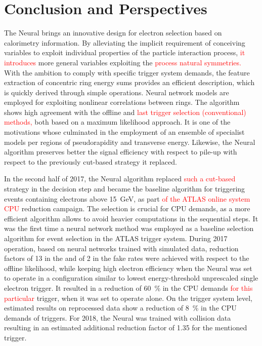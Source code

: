 \chapter{Conclusion and Perspectives}\label{sec:conclusion}






The Neural\rnn{} brings an innovative design for electron selection based on
calorimetry information. By alleviating the implicit requirement of conceiving
variables to exploit individual properties of the particle interaction process, \textcolor{red}{it introduces} 
more general variables exploiting the \textcolor{red}{process natural symmetries.} With the
ambition to comply with specific trigger system demands, the feature extraction
of concentric ring energy sums provides an efficient description, which is quickly derived
through simple operations. Neural network models are employed for exploiting
nonlinear correlations between rings. The algorithm shows
high agreement with the offline and \textcolor{red}{last trigger selection (conventional) methods,} both based
on a maximum likelihood approach. It is one of the motivations whose culminated
in the employment of an ensemble of specialist models per regions of
pseudorapidity and transverse energy. Likewise, the Neural\rnn{} algorithm preserves
better the signal efficiency with respect to pile-up with respect to the
previously cut-based strategy it replaced.



In the second half of 2017, the Neural\rnn{} algorithm replaced \textcolor{red}{such a cut-based} strategy
in the \fastcalo{} decision step and became the baseline algorithm
for triggering events containing electrons above \SI{15}{\GeV}, as part \textcolor{red}{of the ATLAS online system CPU} reduction campaign. The \fastcalo{} selection is crucial for CPU demands, as a more
efficient algorithm allows to avoid heavier computations in the
sequential steps.  It was the first time a neural network method was employed as
a baseline selection algorithm for event selection in the ATLAS trigger system.
During 2017 operation, based on neural networks trained with simulated data,
reduction factors of 13 in the \fastcalo{} and of 2 in
the \hlt{} fake rates were achieved with respect to the offline likelihood, while
keeping high electron efficiency when the Neural\rnn{} was set to operate in a
configuration similar to lowest energy-threshold unprescaled single electron
trigger. It resulted in a reduction of \SI{60}{\%} in the CPU demands \textcolor{red}{for this particular} trigger, when it was set to operate alone. On the trigger system level,
estimated results on reprocessed data show a reduction of \SI{8}{\%} in the CPU
demands of \egamma{} triggers. For 2018, the Neural\rnn{} was trained with collision
data resulting in an estimated additional reduction factor of 1.35 for the
mentioned trigger.


